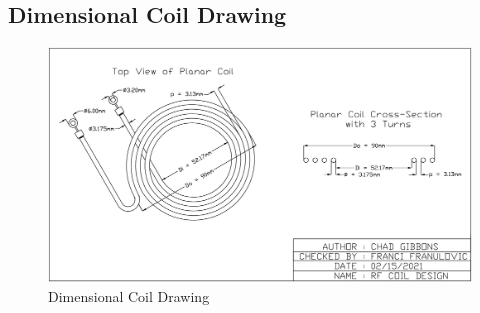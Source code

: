 \documentclass[12pt]{article}
\begin{document}
\begin{appendices}
%
\pagebreak

%
\pagebreak

\pagebreak

\pagebreak

\pagebreak

\pagebreak

\pagebreak
\section{Dimensional Coil Drawing}
\hfill
\begin{figure}[h!]
\centering
\includegraphics[angle=90,width=0.70\linewidth]{Coil_CAD}
\caption{Dimensional Coil Drawing}
\end{figure}
\hfill
\pagebreak

\end{appendices}
\end{document}

